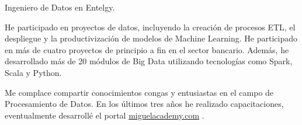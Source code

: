 

\begin{cvparagraph}


Ingeniero de Datos en Entelgy.

He participado en proyectos de datos, incluyendo la creaci\'on de procesos ETL, el despliegue y la productivizaci\'on de modelos de Machine Learning.
He participado en m\'as de cuatro proyectos de principio a fin en el sector bancario.
Adem\'as, he desarrollado m\'as de 20 m\'odulos de Big Data utilizando tecnolog\'ias como Spark, Scala y Python.


Me complace compartir conocimientos congas y entusiastas en el campo de Procesamiento de Datos.
En los \'ultimos tres años he realizado capacitaciones, eventualmente desarroll\'e el portal \href{www.miguelacademy.com}{miguelacademy.com} .

\end{cvparagraph}
